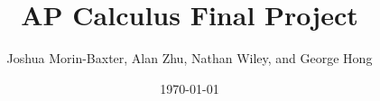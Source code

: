 \documentclass{article}
\begin{document}
\title{AP Calculus Final Project}
\author{Joshua Morin-Baxter, Alan Zhu, Nathan Wiley, and George Hong}
\date{\today}

\maketitle
\end{document}
